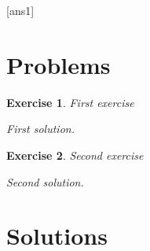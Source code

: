 \documentclass[12pt,a4paper]{article}
\newtheorem{ex}{Exercise}
\begin{document}
[ans1]
\section{Problems}
\begin{ex}
   First exercise
   \begin{sol}
      First solution.
   \end{sol}
\end{ex}
\begin{ex}
   Second exercise
   \begin{sol}
      Second solution.
   \end{sol}
\end{ex}
\section{Solutions}

\end{document}
